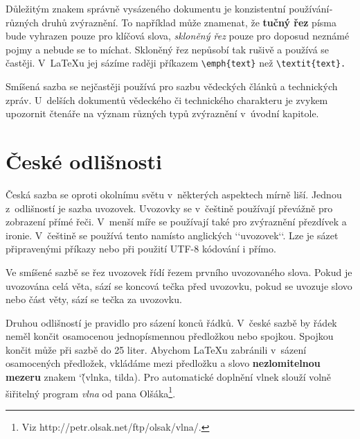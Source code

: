 \documentclass[11pt]{article}
\begin{document}
\begin{multicols*}{2}
			Důležitým znakem správně vysázeného dokumentu je konzistentní použí­vání­ různých druhů
			zvýraznění­. To napří­klad může znamenat, že \textbf{tučný řez} pí­sma bude vyhrazen pouze
			pro klíčová slova, \textit{skloněný řez} pouze pro doposud neznámé pojmy a nebude se to
			míchat. Skloněný řez nepůsobí­ tak rušivě a použí­vá se častěji. V~\LaTeX u jej sází­me
			raději pří­kazem \verb|\emph{text}| než \verb|\textit{text}.|

			Smíšená sazba se nejčastěji používá pro sazbu vědeckých článků a technických zpráv.
U~delší­ch dokumentů vědeckého či technického charakteru je zvykem upozornit čtenáře na
			význam různých typů zvýraznění­ v~úvodní­ kapitole.

		\section{České odlišnosti}

			Česká sazba se oproti okolní­mu světu v~některých aspektech mí­rně liší­. Jednou z~odlišností
			je sazba uvozovek. Uvozovky se v~češtině použí­vají­ převážně pro zobrazení­ pří­mé řeči.
V~menší­ míře se použí­vají­ také pro zvýraznění­ přezdí­vek a ironie. V~češtině se použí­vá tento
			\textbf{} namí­sto anglických ‘‘uvozovek‘‘. Lze je sázet připravenými
			příkazy nebo při použití UTF-8 kódování i přímo.

			Ve smíšené sazbě se řez uvozovek ří­dí­ řezem první­ho uvozovaného slova. Pokud je uvozována
			celá věta, sází­ se koncová tečka před uvozovku, pokud se uvozuje slovo nebo část věty,
			sází­ se tečka za uvozovku.

			Druhou odlišností je pravidlo pro sázení­ konců řádků. V~české sazbě by řádek neměl končit
			osamocenou jednopí­smennou předložkou nebo spojkou.
			Spojkou  končit může při sazbě do 25 liter. Abychom LaTeXu zabránili v~sázení
			osamocených předložek, vkládáme mezi předložku a slovo \textbf{nezlomitelnou mezeru}
			znakem \char`\~ (vlnka, tilda). Pro automatické doplnění vlnek slouží volně šiřitelný 
			program \textit{vlna} od pana Olšáka\footnote{Viz http://petr.olsak.net/ftp/olsak/vlna/.}.
			
			

	\end{multicols*}
\end{document}
